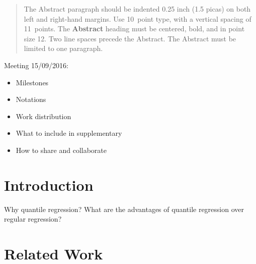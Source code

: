 \documentclass[twoside]{article} \usepackage{aistats2017}
\newcommand{\warn}[1]{{\color{red} #1}}
\begin{document}
%

%


\begin{abstract}
  The Abstract paragraph should be indented 0.25 inch (1.5 picas) on
  both left and right-hand margins. Use 10~point type, with a vertical
  spacing of 11~points. The {\bf Abstract} heading must be centered,
  bold, and in point size 12. Two line spaces precede the
  Abstract. The Abstract must be limited to one paragraph.
\end{abstract}

	\warn{Meeting 15/09/2016:
		
		\begin{itemize}
			\item Milestones
			\item Notations
			\item Work distribution
			\item What to include in supplementary
			\item How to share and collaborate
		\end{itemize}}

\section{Introduction}
		
	\warn{Why quantile regression? What are the advantages of quantile regression over regular regression?}
	
	
\section{Related Work}
\end{document}
